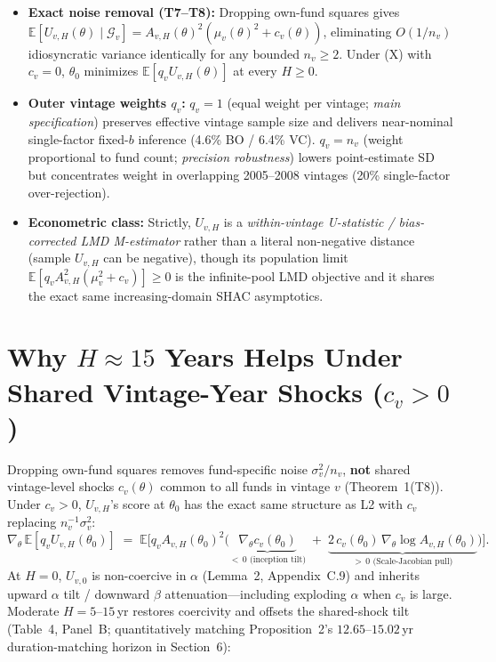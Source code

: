\documentclass[10.5pt]{article}
\newcommand{\E}{\mathbb{E}}
\newcommand{\G}{\mathcal{G}}
\begin{document}
\begin{itemize}
  \item \textbf{Exact noise removal (T7--T8):} Dropping own-fund squares gives $\E[U_{v,H}(\theta)\mid\G_v] = A_{v,H}(\theta)^2(\mu_v(\theta)^2 + c_v(\theta))$, eliminating $O(1/n_v)$ idiosyncratic variance identically for any bounded $n_v\ge 2$. Under (X) with $c_v=0$, $\theta_0$ minimizes $\E[q_v U_{v,H}(\theta)]$ at every $H\ge 0$.
  \item \textbf{Outer vintage weights $q_v$:} $q_v=1$ (equal weight per vintage; \emph{main specification}) preserves effective vintage sample size and delivers near-nominal single-factor fixed-$b$ inference (4.6\% BO / 6.4\% VC). $q_v=n_v$ (weight proportional to fund count; \emph{precision robustness}) lowers point-estimate SD but concentrates weight in overlapping 2005--2008 vintages (20\% single-factor over-rejection).
  \item \textbf{Econometric class:} Strictly, $U_{v,H}$ is a \emph{within-vintage U-statistic / bias-corrected LMD M-estimator} rather than a literal non-negative distance (sample $U_{v,H}$ can be negative), though its population limit $\E[q_v A_{v,H}^2(\mu_v^2+c_v)]\ge 0$ is the infinite-pool LMD objective and it shares the exact same increasing-domain SHAC asymptotics.
\end{itemize}

\section{Why $H \approx 15$ Years Helps Under Shared Vintage-Year Shocks ($c_v > 0$)}

Dropping own-fund squares removes fund-specific noise $\sigma_v^2/n_v$, \textbf{not} shared vintage-level shocks $c_v(\theta)$ common to all funds in vintage $v$ (Theorem~1(T8)). Under $c_v>0$, $U_{v,H}$'s score at $\theta_0$ has the exact same structure as L2 with $c_v$ replacing $n_v^{-1}\sigma_v^2$:
\[
\nabla_\theta\,\E[q_v U_{v,H}(\theta_0)]
\;=\; \E\!\Big[q_v A_{v,H}(\theta_0)^2\Big(\underbrace{\nabla_\theta c_v(\theta_0)}_{<\,0\text{ (inception tilt)}} \;+\; \underbrace{2\,c_v(\theta_0)\,\nabla_\theta\log A_{v,H}(\theta_0)}_{>\,0\text{ (Scale-Jacobian pull)}}\Big)\Big].
\]
At $H=0$, $U_{v,0}$ is non-coercive in $\alpha$ (Lemma~2, Appendix~C.9) and inherits upward $\alpha$ tilt / downward $\beta$ attenuation—including exploding $\alpha$ when $c_v$ is large. Moderate $H=5$--$15$\,yr restores coercivity and offsets the shared-shock tilt (Table~4, Panel~B; quantitatively matching Proposition~2's $12.65\text{--}15.02$\,yr duration-matching horizon in Section~6):
\end{document}
